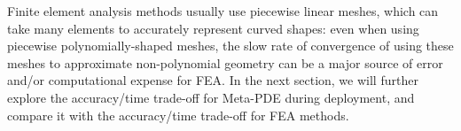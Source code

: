 Finite element analysis methods usually use piecewise linear meshes, which can take many elements to accurately represent curved shapes: even when using piecewise polynomially-shaped meshes, the slow rate of convergence of using these meshes to approximate non-polynomial geometry can be a major source of error and/or computational expense for FEA. In the next section, we will further explore the accuracy/time trade-off for Meta-PDE during deployment, and compare it with the accuracy/time trade-off for FEA methods. 


